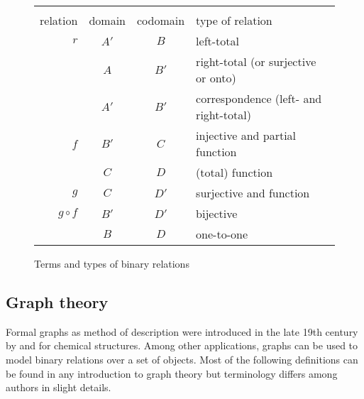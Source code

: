 \begin{figure}

\begin{tabular}{rccl}
& & & \\
relation & domain & codomain & type of relation \\
\hline
$r$	       & $A'$  & $B$  & left-total \\
	       & $A$   & $B'$ & right-total (or surjective or onto) \\
	       & $A'$  & $B'$ & correspondence (left- and right-total) \\
$f$        & $B'$  & $C$  & injective and partial function \\
	       & $C$   & $D$  & (total) function \\ 
$g$        & $C$   & $D'$ & surjective and function \\
$g\circ f$ & $B'$  & $D'$ & bijective \\
	       & $B$   & $D$  & one-to-one \\
\end{tabular}
\caption{Terms and types of binary relations}
\label{fig:binaryrelations}
\end{figure}


\subsection{Graph theory}
\label{sec:graphtheory}

Formal graphs as method of description were introduced in the late 19th century
by \textcite{Cayley1857} and \textcite{Sylvester1878} for chemical structures.
Among other applications, graphs can be used to model binary relations over a
set of objects. Most of the following definitions can be found in any
introduction to graph theory but terminology differs among authors in slight
details.

